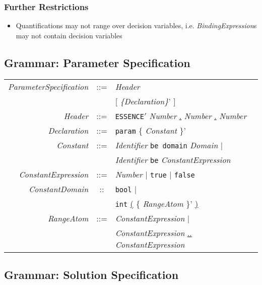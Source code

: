 \documentclass{article}
\begin{document}
\subsubsection{Further Restrictions}

\begin{itemize}
\item Quantifications may not range over decision variables, i.e. {\it
  BindingExpression}s may not contain decision variables
\end{itemize}



\subsection{Grammar: Parameter Specification}

\begin{tabular}{rcl}
\textit{ParameterSpecification} & ::= & \textit{Header}\\
               &     & [ \textit{ \{Declaration\}}' ] \\

 \textit{Header}& ::= & \texttt{ESSENCE}\underline{$'$} \textit{Number} \underline{.} \textit{Number} \underline{.} \textit{Number} \\
 \textit{Declaration} & ::=    & \texttt{param} \{ \textit{Constant} \}' \\
 \textit{Constant}  & ::=  & \textit{Identifier}  \texttt{be domain} \textit{Domain} $\mid$ \\
                           & & \textit{Identifier}  \texttt{be} \textit{ConstantExpression} \\


\textit{ConstantExpression} & ::= & \textit{Number} $\mid$ \texttt{true} $\mid$ \texttt{false}  \\
\textit{ConstantDomain} & :: & \texttt{bool} $\mid$ \\
                      &    & \texttt{int} \underline{(} \{ \textit{RangeAtom} \}' \underline{)} \\
\textit{RangeAtom} & ::= & \textit{ConstantExpression} $\mid$ \\
                   &     & \textit{ConstantExpression} \underline{..} \textit{ConstantExpression} \\ 

\end{tabular}



\subsection{Grammar: Solution Specification}
\end{document}

